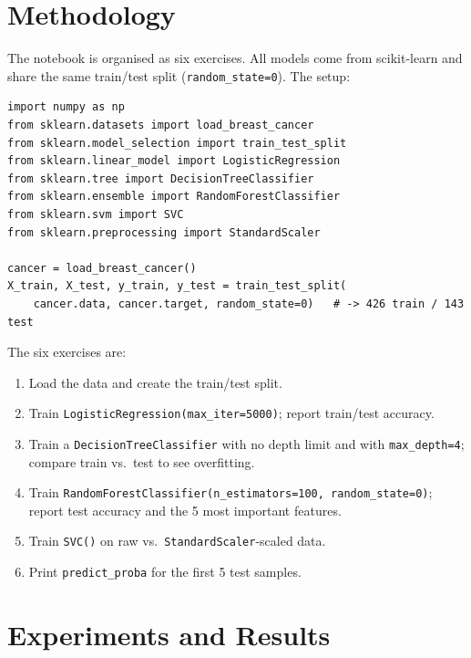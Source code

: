 \documentclass[11pt,a4paper]{article}
\begin{document}
\section{Methodology}
The notebook is organised as six exercises. All models come from scikit-learn
and share the same train/test split (\lstinline|random_state=0|). The setup:

\begin{lstlisting}[caption={Imports and data split (Exercise 1).},label={lst:setup}]
import numpy as np
from sklearn.datasets import load_breast_cancer
from sklearn.model_selection import train_test_split
from sklearn.linear_model import LogisticRegression
from sklearn.tree import DecisionTreeClassifier
from sklearn.ensemble import RandomForestClassifier
from sklearn.svm import SVC
from sklearn.preprocessing import StandardScaler

cancer = load_breast_cancer()
X_train, X_test, y_train, y_test = train_test_split(
    cancer.data, cancer.target, random_state=0)   # -> 426 train / 143 test
\end{lstlisting}

\noindent The six exercises are:
\begin{enumerate}[leftmargin=*]
  \item Load the data and create the train/test split.
  \item Train \lstinline|LogisticRegression(max_iter=5000)|; report train/test accuracy.
  \item Train a \lstinline|DecisionTreeClassifier| with no depth limit and with
        \lstinline|max_depth=4|; compare train vs.\ test to see overfitting.
  \item Train \lstinline|RandomForestClassifier(n_estimators=100, random_state=0)|;
        report test accuracy and the 5 most important features.
  \item Train \lstinline|SVC()| on raw vs.\ \lstinline|StandardScaler|-scaled data.
  \item Print \lstinline|predict_proba| for the first 5 test samples.
\end{enumerate}

\section{Experiments and Results}
\end{document}
